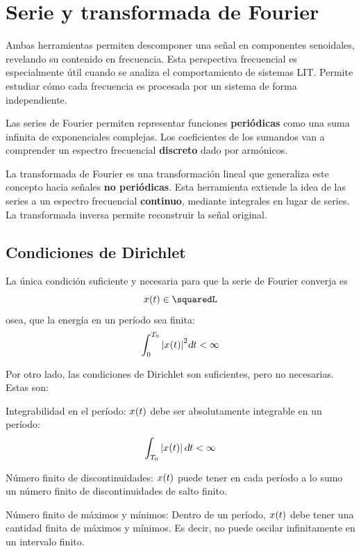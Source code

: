 \chapter{Serie y transformada de Fourier}

Ambas herramientas permiten descomponer una señal en componentes senoidales, revelando su contenido en frecuencia.
Esta perspectiva frecuencial es especialmente útil cuando se analiza el comportamiento de sistemas LIT.
Permite estudiar cómo cada frecuencia es procesada por un sistema de forma independiente.

Las series de Fourier permiten representar funciones \textbf{periódicas} como una suma infinita de exponenciales complejas.
Los coeficientes de los sumandos van a comprender un espectro frecuencial \textbf{discreto} dado por armónicos.

La transformada de Fourier es una transformación lineal que generaliza este concepto hacia señales \textbf{no periódicas}.
Esta herramienta extiende la idea de las series a un espectro frecuencial \textbf{continuo}, mediante integrales en lugar de series.
La transformada inversa permite reconstruir la señal original.

\section{Condiciones de Dirichlet}

La única condición suficiente y necesaria para que la serie de Fourier converja es
\[
    \fx[x]{t} \in \squaredL
\]
osea, que la energía en un período sea finita:
\[
    \int_0^{T_0} \norm{\fx[x]{t}}^2 \dif t < \infty
\]

Por otro lado, las condiciones de Dirichlet son suficientes, pero no necesarias.
Estas son:

\begin{numset}
    \begin{numitem}{Integrabilidad en el período:}
        $\fx[x]{t}$ debe ser absolutamente integrable en un período:
        \[
            \int_{T_0} \norm{\fx[x]{t}} \, \dif t < \infty
        \]
    \end{numitem}

    \begin{numitem}{Número finito de discontinuidades:}
        $\fx[x]{t}$ puede tener en cada período a lo sumo un número finito de discontinuidades de salto finito.
    \end{numitem}

    \begin{numitem}{Número finito de máximos y mínimos:}
        Dentro de un período, $\fx[x]{t}$ debe tener una cantidad finita de máximos y mínimos.
        Es decir, no puede oscilar infinitamente en un intervalo finito.
    \end{numitem}
\end{numset}

